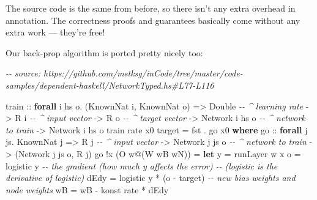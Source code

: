 \documentclass[]{article}
\newenvironment{Shaded}{}{}
\newcommand{\CommentTok}[1]{\textcolor[rgb]{0.38,0.63,0.69}{\textit{#1}}}
\newcommand{\DataTypeTok}[1]{\textcolor[rgb]{0.56,0.13,0.00}{#1}}
\newcommand{\FunctionTok}[1]{\textcolor[rgb]{0.02,0.16,0.49}{#1}}
\newcommand{\KeywordTok}[1]{\textcolor[rgb]{0.00,0.44,0.13}{\textbf{#1}}}
\newcommand{\NormalTok}[1]{#1}
\newcommand{\OperatorTok}[1]{\textcolor[rgb]{0.40,0.40,0.40}{#1}}
\newcommand{\OtherTok}[1]{\textcolor[rgb]{0.00,0.44,0.13}{#1}}
\begin{document}
The source code is the same from before, so there isn't any extra overhead in
annotation. The correctness proofs and guarantees basically come without any
extra work --- they're free!

Our back-prop algorithm is ported pretty nicely too:

\begin{Shaded}
\begin{Highlighting}[]
\CommentTok{{-}{-} source: https://github.com/mstksg/inCode/tree/master/code{-}samples/dependent{-}haskell/NetworkTyped.hs\#L77{-}L116}

\OtherTok{train ::} \KeywordTok{forall}\NormalTok{ i hs o}\OperatorTok{.}\NormalTok{ (}\DataTypeTok{KnownNat}\NormalTok{ i, }\DataTypeTok{KnownNat}\NormalTok{ o)}
      \OtherTok{=>} \DataTypeTok{Double}           \CommentTok{{-}{-} \^{} learning rate}
      \OtherTok{{-}>} \DataTypeTok{R}\NormalTok{ i              }\CommentTok{{-}{-} \^{} input vector}
      \OtherTok{{-}>} \DataTypeTok{R}\NormalTok{ o              }\CommentTok{{-}{-} \^{} target vector}
      \OtherTok{{-}>} \DataTypeTok{Network}\NormalTok{ i hs o   }\CommentTok{{-}{-} \^{} network to train}
      \OtherTok{{-}>} \DataTypeTok{Network}\NormalTok{ i hs o}
\NormalTok{train rate x0 target }\OtherTok{=} \FunctionTok{fst} \OperatorTok{.}\NormalTok{ go x0}
  \KeywordTok{where}
\OtherTok{    go  ::} \KeywordTok{forall}\NormalTok{ j js}\OperatorTok{.} \DataTypeTok{KnownNat}\NormalTok{ j}
        \OtherTok{=>} \DataTypeTok{R}\NormalTok{ j              }\CommentTok{{-}{-} \^{} input vector}
        \OtherTok{{-}>} \DataTypeTok{Network}\NormalTok{ j js o   }\CommentTok{{-}{-} \^{} network to train}
        \OtherTok{{-}>}\NormalTok{ (}\DataTypeTok{Network}\NormalTok{ j js o, }\DataTypeTok{R}\NormalTok{ j)}
\NormalTok{    go }\OperatorTok{!}\NormalTok{x (}\DataTypeTok{O}\NormalTok{ w}\OperatorTok{@}\NormalTok{(}\DataTypeTok{W}\NormalTok{ wB wN))}
        \OtherTok{=} \KeywordTok{let}\NormalTok{ y    }\OtherTok{=}\NormalTok{ runLayer w x}
\NormalTok{              o    }\OtherTok{=}\NormalTok{ logistic y}
              \CommentTok{{-}{-} the gradient (how much y affects the error)}
              \CommentTok{{-}{-}   (logistic\textquotesingle{} is the derivative of logistic)}
\NormalTok{              dEdy }\OtherTok{=}\NormalTok{ logistic\textquotesingle{} y }\OperatorTok{*}\NormalTok{ (o }\OperatorTok{{-}}\NormalTok{ target)}
              \CommentTok{{-}{-} new bias weights and node weights}
\NormalTok{              wB\textquotesingle{}  }\OtherTok{=}\NormalTok{ wB }\OperatorTok{{-}}\NormalTok{ konst rate }\OperatorTok{*}\NormalTok{ dEdy}

\end{Highlighting}
\end{Shaded}
\end{document}
